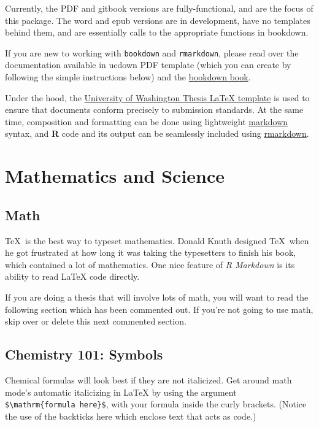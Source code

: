 Currently, the PDF and gitbook versions are fully-functional, and are the focus of this package. The word and epub versions are in development, have no templates behind them, and are essentially calls to the appropriate functions in bookdown.

If you are new to working with \texttt{bookdown} and \texttt{rmarkdown}, please read over the documentation available in ucdown PDF template (which you can create by following the simple instructions below) and the \href{https://bookdown.org/yihui/bookdown/}{bookdown book}.

Under the hood, the \href{https://github.com/UWIT-IAM/UWThesis}{University of Washington Thesis LaTeX template} is used to ensure that documents conform precisely to submission standards. At the same time, composition and formatting can be done using lightweight \href{http://rmarkdown.rstudio.com/authoring_basics.html}{markdown} syntax, and \textbf{R} code and its output can be seamlessly included using \href{http://rmarkdown.rstudio.com}{rmarkdown}.

\hypertarget{math-sci}{%
\chapter{Mathematics and Science}\label{math-sci}}

\hypertarget{math}{%
\section{Math}\label{math}}

\TeX~is the best way to typeset mathematics. Donald Knuth designed \TeX~when he got frustrated at how long it was taking the typesetters to finish his book, which contained a lot of mathematics. One nice feature of \emph{R Markdown} is its ability to read LaTeX code directly.

If you are doing a thesis that will involve lots of math, you will want to read the following section which has been commented out. If you're not going to use math, skip over or delete this next commented section.

\hypertarget{chemistry-101-symbols}{%
\section{Chemistry 101: Symbols}\label{chemistry-101-symbols}}

Chemical formulas will look best if they are not italicized. Get around math mode's automatic italicizing in LaTeX by using the argument \texttt{\$\textbackslash{}mathrm\{formula\ here\}\$}, with your formula inside the curly brackets. (Notice the use of the backticks here which enclose text that acts as code.)

